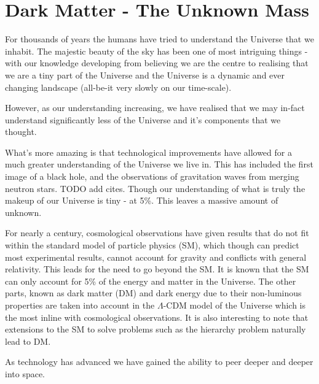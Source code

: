\chapter{Dark Matter - The Unknown Mass}

\par
For thousands of years the humans have tried to understand the Universe that we inhabit.
The majestic beauty of the sky has been one of most intriguing things - with our knowledge developing from believing we are the centre to realising that we are a tiny part of the Universe and the Universe is a dynamic and ever changing landscape (all-be-it very slowly on our time-scale).

\par
However, as our understanding increasing, we have realised that we may in-fact understand significantly less of the Universe and it's components that we thought.

What's more amazing is that technological improvements have allowed for a much greater understanding of the Universe we live in.
This has included the first image of a black hole, and the observations of gravitation waves from merging neutron stars. 
TODO add cites.
Though our understanding of what is truly the makeup of our Universe is tiny - at 5\%. 
This leaves a massive amount of unknown.

For nearly a century, cosmological observations have given results that do not fit within the standard model of particle physics (SM), which though can predict most experimental results, cannot account for gravity and conflicts with general relativity. 
This leads for the need to go beyond the SM. It is known that the SM can only account for 5\% of the energy and matter in the Universe. 
The other parts, known as dark matter (DM) and dark energy due to their non-luminous properties are taken into account in the $\Lambda$-CDM model of the Universe which is the most inline with cosmological observations.
It is also interesting to note that extensions to the SM to solve problems such as the hierarchy problem naturally lead to DM.


\par
As technology has advanced we have gained the ability to peer deeper and deeper into space.






